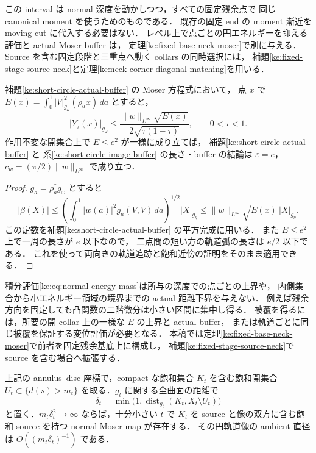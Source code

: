 この interval は normal 深度を動かしつつ，すべての固定残余点で
同じ canonical moment を使うためのものである．
既存の固定 end の moment 漸近を moving cut に代入する必要はない．
レベル上で点ごとの円エネルギーを抑える評価と actual Moser buffer は，
定理\ref{ke:fixed-base-neck-moser}で別に与える．
Source を含む固定段階と三重点へ動く collars の同時選択には，
補題\ref{ke:fixed-stage-source-neck}と定理\ref{ke:neck-corner-diagonal-matching}を用いる．

\begin{corollary}
\label{ke:neck-averaged-speed}
補題\ref{ke:short-circle-actual-buffer} の Moser 方程式において，
点 $x$ で
$E(x)=\int_0^1 |V|_{g_\omega}^2(\rho_a x)\,da$ とすると，
\[
 |Y_\tau(x)|_{g_\omega}
 \le \frac{\|w\|_{L^\infty}\sqrt{E(x)}}{2\sqrt{\tau(1-\tau)}} ,
 \qquad 0<\tau<1 .
\]
作用不変な開集合上で $E\le e^2$ が一様に成り立てば，
補題\ref{ke:short-circle-actual-buffer} と
系\ref{ke:short-circle-image-buffer} の長さ・buffer の結論は
$\varepsilon=e$，$c_w=(\pi/2)\|w\|_{L^\infty}$ で成り立つ．
\end{corollary}

\begin{proof}
$g_a=\rho_a^*g_\omega$ とすると
\[
 |\beta(X)|\le
 \left(\int_0^1 |w(a)|^2 g_a(V,V)\,da\right)^{1/2}
 |X|_{g_\eta}\le \|w\|_{L^\infty}\sqrt{E(x)}\,|X|_{g_\eta}.
\]
この定数を補題\ref{ke:short-circle-actual-buffer} の平方完成に用いる．
また $E\le e^2$ 上で一周の長さが $e$ 以下なので，
二点間の短い方の軌道弧の長さは $e/2$ 以下である．
これを使って両向きの軌道追跡と飽和近傍の証明をそのまま適用できる．
\end{proof}

積分評価\eqref{ke:eq:normal-energy-mass}は所与の深度での点ごとの上界や，
内側集合から小エネルギー領域の境界までの actual 距離下界を与えない．
例えば残余方向を固定しても凸関数の二階微分は小さい区間に集中し得る．
被覆を得るには，所要の開 collar 上の一様な $E$ の上界と actual buffer，
または軌道ごとに同じ被覆を保証する変位評価が必要となる．
本稿では定理\ref{ke:fixed-base-neck-moser}で前者を固定残余基底上に構成し，
補題\ref{ke:fixed-stage-source-neck}で source を含む場合へ拡張する．

\begin{corollary}
\label{ke:neck-shrinking-buffer}
上記の annulus--disc 座標で，compact な飽和集合 $K_t$ を含む飽和開集合
$U_t\subset\{d(s)>m_t\}$ を取る．$g_t$ に関する全曲面の距離で
\[
 \delta_t=\min\bigl(1,\operatorname{dist}_{g_t}(K_t,X_t\setminus U_t)\bigr)
\]
と置く．$m_t\delta_t^2\to\infty$ ならば，十分小さい $t$ で
$K_t$ を source と像の双方に含む飽和 source を持つ normal Moser map が存在する．
その円軌道像の ambient 直径は $O((m_t\delta_t)^{-1})$ である．
\end{corollary}

